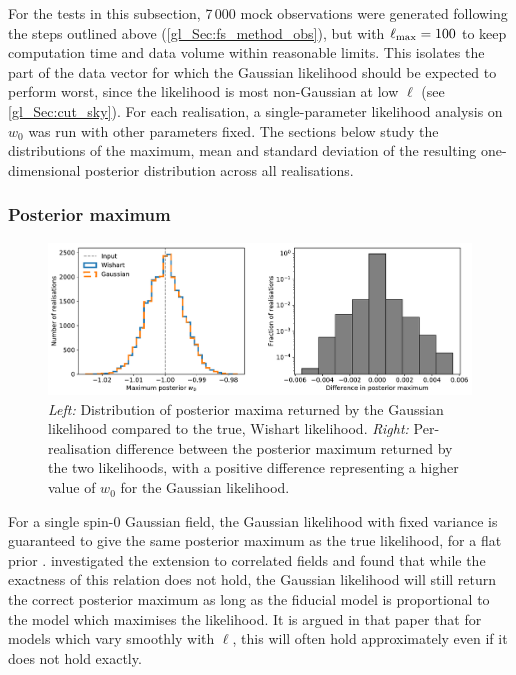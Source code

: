 For the tests in this subsection, 7\,000 mock observations were generated following the steps outlined above (\autoref{gl_Sec:fs_method_obs}), but with $\ell_\text{max} = 100$ to keep computation time and data volume within reasonable limits. This isolates the part of the data vector for which the Gaussian likelihood should be expected to perform worst, since the likelihood is most non-Gaussian at low $\ell$ (see \autoref{gl_Sec:cut_sky}). For each realisation, a single-parameter likelihood analysis on $w_0$ was run with other parameters fixed. The sections below study the distributions of the maximum, mean and standard deviation of the resulting one-dimensional posterior distribution across all realisations.

\subsubsection{Posterior maximum}

\begin{figure}
\centering
\includegraphics[width=\textwidth]{postmax}
\caption{\textit{Left:} Distribution of posterior maxima returned by the Gaussian likelihood compared to the true, Wishart likelihood. \textit{Right:} Per-realisation difference between the posterior maximum returned by the two likelihoods, with a positive difference representing a higher value of $w_0$ for the Gaussian likelihood.}
\label{gl_Fig:postmax}
\end{figure}

For a single spin-0 Gaussian field,
the Gaussian likelihood with fixed variance is guaranteed to give the same posterior maximum as the true likelihood, for a flat prior \citep{Carron2013}.
\citet{Hamimeche2008} investigated the extension to correlated fields and found that while the exactness of this relation does not hold, the Gaussian likelihood will still return the correct posterior maximum as long as the fiducial model is proportional to the model which maximises the likelihood. It is argued in that paper that for models which vary smoothly with $\ell$, this will often hold approximately even if it does not hold exactly.

